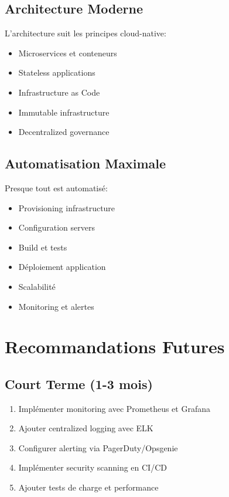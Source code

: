 \documentclass[12pt,a4paper]{report}
\begin{document}
\subsection{Architecture Moderne}

L'architecture suit les principes cloud-native:
\begin{itemize}
    \item Microservices et conteneurs
    \item Stateless applications
    \item Infrastructure as Code
    \item Immutable infrastructure
    \item Decentralized governance
\end{itemize}

\subsection{Automatisation Maximale}

Presque tout est automatisé:
\begin{itemize}
    \item Provisioning infrastructure
    \item Configuration servers
    \item Build et tests
    \item Déploiement application
    \item Scalabilité
    \item Monitoring et alertes
\end{itemize}

\section{Recommandations Futures}

\subsection{Court Terme (1-3 mois)}

\begin{enumerate}
    \item Implémenter monitoring avec Prometheus et Grafana
    \item Ajouter centralized logging avec ELK
    \item Configurer alerting via PagerDuty/Opsgenie
    \item Implémenter security scanning en CI/CD
    \item Ajouter tests de charge et performance
\end{enumerate}
\end{document}
